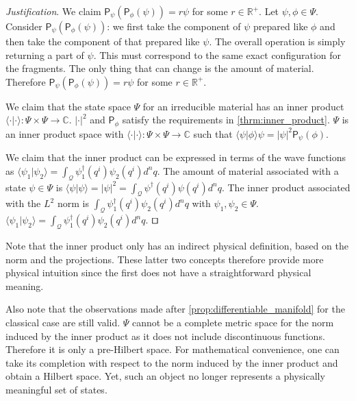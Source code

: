 \documentclass[smallextended]{svjour3}
\numberwithin{equation}{section}
\newenvironment{justification}{\emph{Justification}.}{\hfill\(\qed\)}
\theoremstyle{definition}
\newenvironment{justification}{\emph{Justification}.}{\qed}
\begin{document}
\begin{justification}
	We claim $\mathsf{P}_{\psi} (\mathsf{P}_{\phi} (\psi)) = r \psi$ for some $r \in \mathbb{R}^+$. Let $\psi, \phi \in \Psi$. Consider $\mathsf{P}_{\psi} (\mathsf{P}_{\phi} (\psi))$: we first take the component of $\psi$ prepared like $\phi$ and then take the component of that prepared like $\psi$. The overall operation is simply returning a part of $\psi$. This must correspond to the same exact configuration for the fragments. The only thing that can change is the amount of material. Therefore $\mathsf{P}_{\psi} (\mathsf{P}_{\phi} (\psi)) = r \psi$ for some $r \in \mathbb{R}^+$.
	
	We claim that the state space $\Psi$ for an irreducible material has an inner product $\langle \cdot |\cdot \rangle : \Psi \times \Psi \rightarrow \mathbb{C}$. $| \cdot | ^2$ and $\mathsf{P}_{\phi}$ satisfy the requirements in \ref{thrm:inner_product}. $\Psi$ is an inner product space with $\langle \cdot |\cdot \rangle : \Psi \times \Psi \rightarrow \mathbb{C}$ such that $\langle \psi |\phi \rangle \psi = | \psi | ^2\mathsf{P}_{\psi}(\phi)$.
	
	We claim that the inner product can be expressed in terms of the wave functions as $\langle \psi_1 | \psi_2 \rangle = \int_\mathcal{Q} \psi_1^\dagger (q^i) \psi_2(q^i) d^nq$. The amount of material associated with a state $\psi \in \Psi$ is $\langle \psi | \psi \rangle = | \psi |^2 = \int_\mathcal{Q} \psi^\dagger (q^i) \psi(q^i) d^nq$. The inner product associated with the $L^2$ norm is $\int_\mathcal{Q} \psi_1^\dagger (q^i) \psi_2(q^i) d^nq$ with $\psi_1, \psi_2 \in \Psi$. $\langle \psi_1 | \psi_2 \rangle = \int_\mathcal{Q} \psi_1^\dagger (q^i) \psi_2(q^i) d^nq$.
\end{justification}

Note that the inner product only has an indirect physical definition, based on the norm and the projections. These latter two concepts therefore provide more physical intuition since the first does not have a straightforward physical meaning.

Also note that the observations made after \ref{prop:differentiable_manifold} for the  classical case are still valid. $\Psi$ cannot be a complete metric space for the norm induced by the inner product as it does not include discontinuous functions. Therefore it is only a pre-Hilbert space. For mathematical convenience, one can take its completion with respect to the norm induced by the inner product and obtain a Hilbert space. Yet, such an object no longer represents a physically meaningful set of states.
\end{document}
